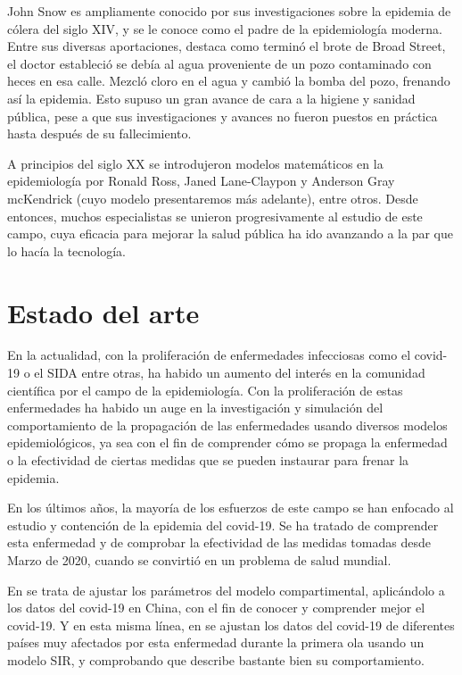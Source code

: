 John Snow es ampliamente conocido por sus investigaciones sobre la epidemia de cólera del siglo XIV, y se le conoce como el padre de la epidemiología moderna. Entre sus diversas aportaciones, destaca como terminó el brote de Broad Street, el doctor estableció se debía al agua proveniente de un pozo contaminado con heces en esa calle. Mezcló cloro en el agua y cambió la bomba del pozo, frenando así la epidemia. Esto supuso un gran avance de cara a la higiene y sanidad pública, pese a que sus investigaciones y avances no fueron puestos en práctica hasta después de su fallecimiento.

A principios del siglo XX se introdujeron modelos matemáticos en la epidemiología por Ronald Ross, Janed Lane-Claypon y Anderson Gray mcKendrick (cuyo modelo presentaremos más adelante), entre otros. Desde entonces, muchos especialistas se unieron progresivamente al estudio de este campo, cuya eficacia para mejorar la salud pública ha ido avanzando a la par que lo hacía la tecnología.

\section{Estado del arte}

En la actualidad, con la proliferación de enfermedades infecciosas como el covid-19 o el SIDA entre otras, ha habido un aumento del interés en la comunidad científica por el campo de la epidemiología. Con la proliferación de estas enfermedades ha habido un auge en la investigación y simulación del comportamiento de la propagación de las enfermedades usando diversos modelos epidemiológicos, ya sea con el fin de comprender cómo se propaga la enfermedad o la efectividad de ciertas medidas que se pueden instaurar para frenar la epidemia.

En los últimos años, la mayoría de los esfuerzos de este campo se han enfocado al estudio y contención de la epidemia del covid-19. Se ha tratado de comprender esta enfermedad y de comprobar la efectividad de las medidas tomadas desde Marzo de 2020, cuando se convirtió en un problema de salud mundial.

En \cite{demongeotSIEpidemicModel} se trata de ajustar los parámetros del modelo compartimental, aplicándolo a los datos del covid-19 en China, con el fin de conocer y comprender mejor el covid-19. Y en esta misma línea, en \cite{enrique_amaro} se ajustan los datos del covid-19 de diferentes países muy afectados por esta enfermedad durante la primera ola usando un modelo SIR, y comprobando que describe bastante bien su comportamiento.

